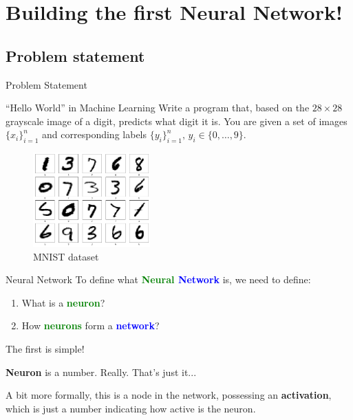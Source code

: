 \documentclass{beamer}
\begin{document}
    \section{Building the first Neural Network!}

    \subsection{Problem statement}
    
    \begin{frame}{Problem Statement}
        \begin{block}{``Hello World'' in Machine Learning}
            Write a program that, based on the $28 \times 28$ grayscale image of a digit, predicts what digit it is. You are given a set of images $\{x_i\}_{i=1}^n$ and corresponding labels $\{y_i\}_{i=1}^n, \, y_i \in \{0,\dots,9\}$.
        \end{block}
        
        \begin{figure}
        \centering
            \includegraphics[width=0.4\textwidth]{images/presentation/mnist_2.png}
            \caption{MNIST dataset}
        \end{figure}
    \end{frame}

    \begin{frame}{Neural Network}
        To define what \textbf{\textcolor{green}{Neural} \textcolor{blue}{Network}} is, we need to define:
        \begin{enumerate}
            \item What is a \textcolor{green}{\textbf{neuron}}?
            \item How \textcolor{green}{\textbf{neurons}} form a \textbf{\textcolor{blue}{network}}?
        \end{enumerate}
        \pause
        The first is simple! 

        \begin{definition}
            \textbf{Neuron} is a number. Really. That's just it...

            A bit more formally, this is a node in the network, possessing an \textbf{activation}, which is just a number indicating how active is the neuron.
        \end{definition}
    \end{frame}
\end{document}
